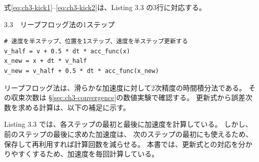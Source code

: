式\eqref{eq:ch3-kick1}--\eqref{eq:ch3-kick2}は、Listing 3.3 の3行に対応する。

\begin{listingbox}{3.3　リープフロッグ法の1ステップ}
\begin{Verbatim}[fontsize=\small]
# 速度を半ステップ、位置を1ステップ、速度を半ステップ更新する
v_half = v + 0.5 * dt * acc_func(x)
x_new = x + dt * v_half
v_new = v_half + 0.5 * dt * acc_func(x_new)
\end{Verbatim}
\end{listingbox}

リープフロッグ法は、滑らかな加速度に対して2次精度の時間積分法である。
その収束次数は §\ref{sec:ch3-convergence}の数値実験で確認する。
更新式から誤差次数を求める計算は、以下の補足に示す。

Listing 3.3 では、各ステップの最初と最後に加速度を計算している。
しかし、前のステップの最後に求めた加速度は、
次のステップの最初にも使えるため、保存して再利用すれば計算回数を減らせる。
本書では、更新式との対応を分かりやすくするため、加速度を毎回計算している。

